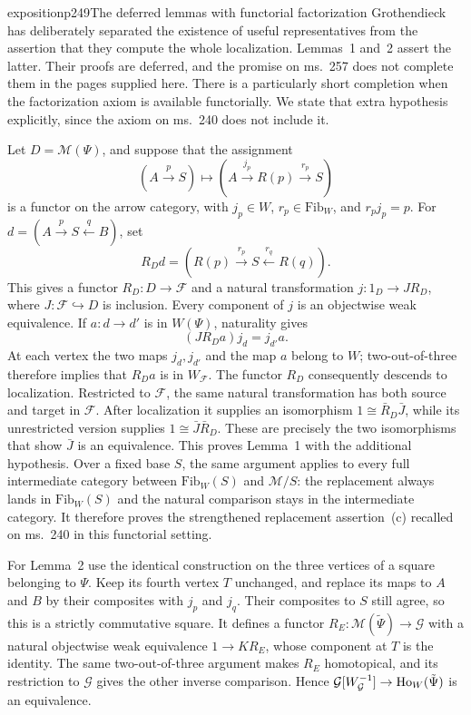 \begin{dcomment}{exposition}{p249}{The deferred lemmas with functorial factorization}
Grothendieck has deliberately separated the existence of useful representatives from the assertion that they compute the whole localization. Lemmas~1 and~2 assert the latter. Their proofs are deferred, and the promise on ms.~257 does not complete them in the pages supplied here. There is a particularly short completion when the factorization axiom is available functorially. We state that extra hypothesis explicitly, since the axiom on ms.~240 does not include it.

Let $D=\mathcal M(\Psi)$, and suppose that the assignment
\[
 (A\xrightarrow p S)\longmapsto
 (A\xrightarrow{j_p}R(p)\xrightarrow{r_p}S)
\]
is a functor on the arrow category, with $j_p\in W$, $r_p\in\mathrm{Fib}_W$, and $r_pj_p=p$. For $d=(A\xrightarrow p S\xleftarrow q B)$, set
\[
 R_Dd=(R(p)\xrightarrow{r_p}S\xleftarrow{r_q}R(q)).
\]
This gives a functor $R_D:D\to\mathcal F$ and a natural transformation $j:1_D\to J R_D$, where $J:\mathcal F\hookrightarrow D$ is inclusion. Every component of $j$ is an objectwise weak equivalence. If $a:d\to d'$ is in $W(\Psi)$, naturality gives
\[
 (J R_Da)j_d=j_{d'}a.
\]
At each vertex the two maps $j_d,j_{d'}$ and the map $a$ belong to $W$; two-out-of-three therefore implies that $R_Da$ is in $W_{\mathcal F}$. The functor $R_D$ consequently descends to localization. Restricted to $\mathcal F$, the same natural transformation has both source and target in $\mathcal F$. After localization it supplies an isomorphism $1\cong \bar R_D\bar J$, while its unrestricted version supplies $1\cong\bar J\bar R_D$. These are precisely the two isomorphisms that show $\bar J$ is an equivalence. This proves Lemma~1 with the additional hypothesis. Over a fixed base $S$, the same argument applies to every full intermediate category between $\mathrm{Fib}_W(S)$ and $\mathcal M/S$: the replacement always lands in $\mathrm{Fib}_W(S)$ and the natural comparison stays in the intermediate category. It therefore proves the strengthened replacement assertion~(c) recalled on ms.~240 in this functorial setting.

For Lemma~2 use the identical construction on the three vertices of a square belonging to $\Psi$. Keep its fourth vertex $T$ unchanged, and replace its maps to $A$ and $B$ by their composites with $j_p$ and $j_q$. Their composites to $S$ still agree, so this is a strictly commutative square. It defines a functor $R_E:\mathcal M(\tilde\Psi)\to\mathcal G$ with a natural objectwise weak equivalence $1\to K R_E$, whose component at $T$ is the identity. The same two-out-of-three argument makes $R_E$ homotopical, and its restriction to $\mathcal G$ gives the other inverse comparison. Hence $\mathcal G[W_{\mathcal G}^{-1}]\to\mathrm{Ho}_W(\tilde\Psi)$ is an equivalence.


\end{dcomment}

